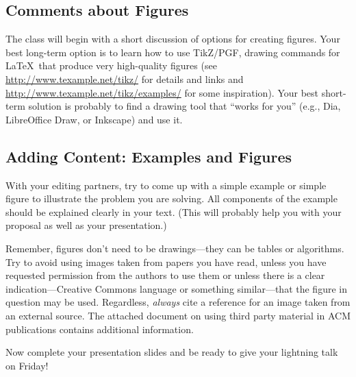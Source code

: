\subsection*{Comments about Figures}

The class will begin with a short discussion of options for creating figures. Your best long-term option is to learn how
to use TikZ/PGF, drawing commands for \LaTeX\ that produce very high-quality figures (see
  \url{http://www.texample.net/tikz/} for details and links and \url{http://www.texample.net/tikz/examples/}
  for some inspiration). Your best short-term solution is probably to find a drawing tool that ``works for you'' (e.g.,
    Dia, LibreOffice Draw, or Inkscape) and use it. 

\subsection*{Adding Content: Examples and Figures}

With your editing partners, try to come up with a simple example or simple figure to illustrate the problem you are
solving. All components of the example should be explained clearly in your text.  (This will probably help you with your
proposal as well as your presentation.)

Remember, figures don't need to be drawings---they can be tables or algorithms. Try to avoid using images taken from
papers you have read, unless you have requested permission from the authors to use them or unless there is a clear
indication---Creative Commons language or something similar---that the figure in question may be used. Regardless, {\em
always} cite a reference for an image taken from an external source. The attached document on using third party material
in ACM publications contains additional information.

Now complete your presentation slides and be ready to give your lightning talk on Friday!






